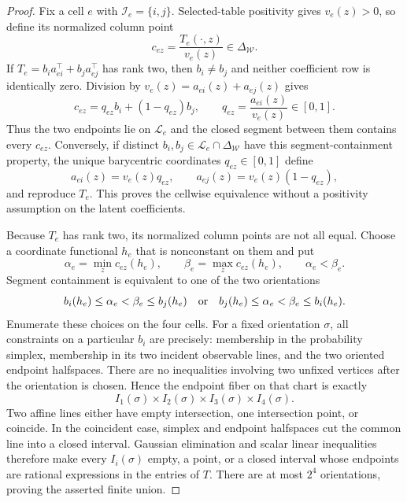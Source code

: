 \documentclass{article}
\begin{document}
\begin{proof}
Fix a cell \(e\) with \(\mathcal I_e=\{i,j\}\).  Selected-table positivity gives \(v_e(z)>0\), so define its normalized column point
\[
c_{ez}=\frac{T_e(\cdot,z)}{v_e(z)}\in\Delta_{\mathcal W}.
\]
If \(T_e=b_i a_{ei}^{\top}+b_j a_{ej}^{\top}\) has rank two, then \(b_i\ne b_j\) and neither coefficient row is identically zero.  Division by \(v_e(z)=a_{ei}(z)+a_{ej}(z)\) gives
\[
c_{ez}=q_{ez}b_i+(1-q_{ez})b_j,
\qquad
q_{ez}=\frac{a_{ei}(z)}{v_e(z)}\in[0,1].
\]
Thus the two endpoints lie on \(\mathcal L_e\) and the closed segment between them contains every \(c_{ez}\).  Conversely, if distinct \(b_i,b_j\in\mathcal L_e\cap\Delta_{\mathcal W}\) have this segment-containment property, the unique barycentric coordinates \(q_{ez}\in[0,1]\) define
\[
a_{ei}(z)=v_e(z)q_{ez},
\qquad
a_{ej}(z)=v_e(z)(1-q_{ez}),
\]
and reproduce \(T_e\).  This proves the cellwise equivalence without a positivity assumption on the latent coefficients.

Because \(T_e\) has rank two, its normalized column points are not all equal.  Choose a coordinate functional \(h_e\) that is nonconstant on them and put
\[
\alpha_e=\min_z c_{ez}(h_e),
\qquad
\beta_e=\max_z c_{ez}(h_e),
\qquad \alpha_e<\beta_e.
\]
Segment containment is equivalent to one of the two orientations
\[
b_i(h_e)\le\alpha_e<\beta_e\le b_j(h_e)
\quad\hbox{or}\quad
b_j(h_e)\le\alpha_e<\beta_e\le b_i(h_e).
\]
Enumerate these choices on the four cells.  For a fixed orientation \(\sigma\), all constraints on a particular \(b_i\) are precisely: membership in the probability simplex, membership in its two incident observable lines, and the two oriented endpoint halfspaces.  There are no inequalities involving two unfixed vertices after the orientation is chosen.  Hence the endpoint fiber on that chart is exactly
\[
I_1(\sigma)\times I_2(\sigma)\times I_3(\sigma)\times I_4(\sigma).
\]
Two affine lines either have empty intersection, one intersection point, or coincide.  In the coincident case, simplex and endpoint halfspaces cut the common line into a closed interval.  Gaussian elimination and scalar linear inequalities therefore make every \(I_i(\sigma)\) empty, a point, or a closed interval whose endpoints are rational expressions in the entries of \(T\).  There are at most \(2^4\) orientations, proving the asserted finite union.


\end{proof}
\end{document}
